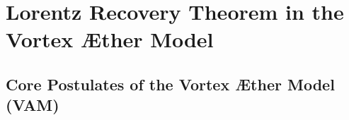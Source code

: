 \documentclass[12pt]{article}
\begin{document}
    \titlepageClose
    \fi

    \ifdefined\standalonechapter
    \section{\papertitle}
    \else
    \fi
\section*{Lorentz Recovery Theorem in the Vortex Æther Model}

    \subsection*{Core Postulates of the Vortex Æther Model (VAM)}
\end{document}

